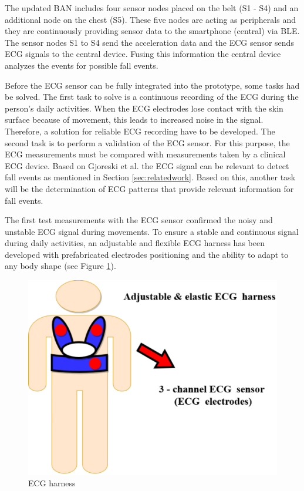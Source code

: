\documentclass[10pt,journal,compsoc]{IEEEtran}
\begin{document}
The updated BAN includes four sensor nodes placed on the belt (S1 - S4) and an additional node on the chest (S5). These five nodes are acting as peripherals and they are continuously providing sensor data to the smartphone (central) via BLE. The sensor nodes S1 to S4 send the acceleration data and the ECG sensor sends ECG signals to the central device. Fusing this information the central device analyzes the events for possible fall events.

Before the ECG sensor can be fully integrated into the prototype, some tasks had be solved. The first task to solve is a continuous recording of the ECG during the person's daily activities. When the ECG electrodes lose contact with the skin surface because of movement, this leads to increased noise in the signal. Therefore, a solution for reliable ECG recording have to be developed. The second task is to perform a validation of the ECG sensor. For this purpose, the  ECG measurements must be compared with measurements taken by a clinical ECG device. Based on Gjoreski et al. \cite{Gjoreski2014} the ECG signal can be relevant to detect fall events as mentioned in Section \ref{sec:relatedwork}. Based on this, another task will be the determination of ECG patterns that provide relevant information for fall events.

The first test measurements with the ECG sensor confirmed the noisy and unstable ECG signal during movements. To ensure a stable and continuous signal during daily activities, an adjustable and flexible ECG harness has been developed with prefabricated electrodes positioning and the ability to adapt to any body shape (see Figure \ref{fig:ECGHarness}).
\begin{figure}[!ht]
	\centering
	\includegraphics[scale=0.29]{Images/ECG-Harness.eps}
	\caption[ECG - Harness]{ECG harness}
	\label{fig:ECGHarness}
\end{figure}
\end{document}
